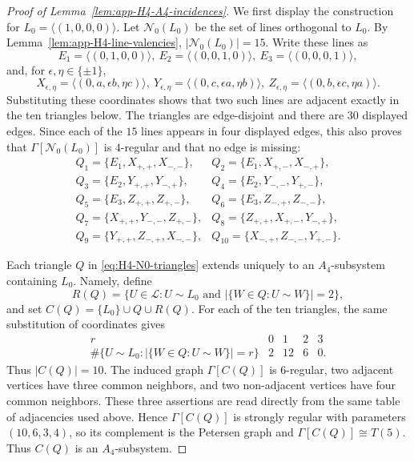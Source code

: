 \documentclass[10pt,a4paper]{amsart}
\begin{document}
\begin{proof}[Proof of Lemma~\ref{lem:app-H4-A4-incidences}]
We first display the construction for
\(L_{0}=\langle(1,0,0,0)\rangle\).  Let \(\mathcal N_{0}(L_{0})\) be the
set of lines orthogonal to \(L_{0}\).  By
Lemma~\ref{lem:app-H4-line-valencies},
\(|\mathcal N_{0}(L_{0})|=15\).  Write these lines as
\[
    E_{1}=\langle(0,1,0,0)\rangle,\ 
    E_{2}=\langle(0,0,1,0)\rangle,\ 
    E_{3}=\langle(0,0,0,1)\rangle,
\]
and, for \(\epsilon,\eta\in\{\pm1\}\),
\[
    X_{\epsilon,\eta}=\langle(0,a,\epsilon b,\eta c)\rangle,\ 
    Y_{\epsilon,\eta}=\langle(0,c,\epsilon a,\eta b)\rangle,\ 
    Z_{\epsilon,\eta}=\langle(0,b,\epsilon c,\eta a)\rangle.
\]
Substituting these coordinates shows that two such lines are adjacent
exactly in the ten triangles below.  The triangles are edge-disjoint and
there are \(30\) displayed edges.  Since each of the \(15\) lines appears
in four displayed edges, this also proves that
\(\Gamma[\mathcal N_{0}(L_{0})]\) is \(4\)-regular and that no edge is missing:
\begin{equation}\label{eq:H4-N0-triangles}
\begin{array}{lll}
Q_{1}=\{E_{1},X_{+,+},X_{-,-}\},&
Q_{2}=\{E_{1},X_{+,-},X_{-,+}\},\\
Q_{3}=\{E_{2},Y_{+,+},Y_{-,+}\},&
Q_{4}=\{E_{2},Y_{-,-},Y_{+,-}\},\\
Q_{5}=\{E_{3},Z_{+,+},Z_{+,-}\},&
Q_{6}=\{E_{3},Z_{-,+},Z_{-,-}\},\\
Q_{7}=\{X_{+,+},Y_{-,-},Z_{+,-}\},&
Q_{8}=\{Z_{+,+},X_{+,-},Y_{-,+}\},\\
Q_{9}=\{Y_{+,+},Z_{-,+},X_{-,-}\},&
Q_{10}=\{X_{-,+},Z_{-,-},Y_{+,-}\}.
\end{array}
\end{equation}

Each triangle \(Q\) in \eqref{eq:H4-N0-triangles} extends uniquely to an
\(A_{4}\)-subsystem containing \(L_{0}\).  Namely, define
\[
    R(Q)=\{U\in\mathcal L:U\sim L_{0}
    \text{ and }|\{W\in Q:U\sim W\}|=2\},
\]
and set \(C(Q)=\{L_{0}\}\cup Q\cup R(Q)\).  For each of the ten triangles,
the same substitution of coordinates gives
\begin{equation}\label{eq:H4-extension-count}
\begin{array}{c|cccc}
r&0&1&2&3\\
\hline
\#\{U\sim L_{0}:|\{W\in Q:U\sim W\}|=r\}
&2&12&6&0 .
\end{array}
\end{equation}
Thus \(|C(Q)|=10\).  The induced graph \(\Gamma[C(Q)]\) is \(6\)-regular,
two adjacent vertices have three common neighbors, and two non-adjacent
vertices have four common neighbors.  These three assertions are read
directly from the same table of adjacencies used above.  Hence
\(\Gamma[C(Q)]\) is strongly regular with parameters \((10,6,3,4)\), so its
complement is the Petersen graph and \(\Gamma[C(Q)]\cong T(5)\).  Thus
\(C(Q)\) is an \(A_{4}\)-subsystem.


\end{proof}
\end{document}
